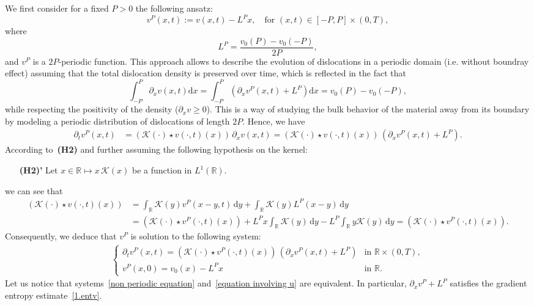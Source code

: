 \documentclass[11pt]{amsart}
\newcommand{\dd}{\mathrm{d}}
\newcommand{\pa}{\partial}
\newcommand{\R}{\mathbb{R}}
\begin{document}
We first consider for a fixed $P>0$ the following ansatz: 
\[
v^P(x, t) := v(x, t) - L^Px, \quad \mbox{for }(x,t) \in [-P,P] \times (0,T),
\]
where 
\begin{equation}\label{def.LP}
L^P=\frac{v_0(P)-v_0(-P)}{2P}, 
\end{equation} 
and $v^P$ is a $2P$-periodic function. This approach allows to describe the evolution of dislocations in a periodic domain (i.e. without boundray effect) assuming that the total dislocation density is preserved over time, which is reflected in the fact that
\begin{equation}\label{densitetotale}
\int_{-P}^P  \partial_x v(x,t) \dd x= \int_{-P}^P  (\partial_x v^P(x,t) +L^P) \dd x= 
 v_0(P)-v_0(-P),
\end{equation}
while respecting the positivity of the density ($\partial_x v \ge 0$). 
This is a way of studying the bulk behavior of the material away from its boundary  by modeling a periodic distribution of dislocations of length $2P$. Hence, we have  
 \begin{align*}
     \partial_t v^P(x,t) &= \left( \mathcal{K}(\cdot) \star v(\cdot,t)(x)\right) \, \partial_x v(x,t)= \left( \mathcal{K}(\cdot) \star v(\cdot,t)(x)\right) \,\left( \partial_x v^P(x, t) + L^P\right).
 \end{align*} 
According to~\textbf{(H2)} and further assuming the following hypothesis on the kernel: 
\begin{itemize}
 \item[\textbf{(H2)'}] Let $x \in \R \mapsto x \, \mathcal{K}(x)$ be a function in $L^1(\R)$.
 \end{itemize}
we  can see that 
 \begin{align*}
     \left( \mathcal{K}(\cdot) \star v(\cdot,t)(x)\right)
     &= \int_{\mathbb{R}}\mathcal{K}(y) v^P(x - y, t)\, \dd y+ \int_{\mathbb{R}}\mathcal{K}(y) L^P(x - y) \, \dd y\\
     &=    \left( \mathcal{K}(\cdot) \star v^P(\cdot,t)(x)\right) + L^Px \int_{\mathbb{R}}\mathcal{K}(y)\, \dd y -  L^P\int_{\mathbb{R}} y\mathcal{K}(y)\, \dd y =   \left(\mathcal{K}(\cdot) \star v^P(\cdot,t)(x)\right).
 \end{align*}
  Consequently, we deduce that  $v^P$ is solution to the following system:
 \begin{align}\label{equation involving u}
 \begin{cases}
        \partial_t v^P(x,t) = \left(\mathcal{K}(\cdot) \star v^P(\cdot,t)(x)\right) \, \left(\partial_x v^P(x, t) + L^P\right) & \mbox{in } \mathbb{R} \times (0, T),\\
        v^P(x,0) = v_0(x) - L^Px & \mbox{in } \mathbb{R}.
 \end{cases}
 \end{align}
Let us notice that systems~\eqref{non periodic equation} and~\eqref{equation involving u} are equivalent. In particular, $\pa_x v^P+L^P$ satisfies the gradient entropy estimate~\eqref{1.entv}.
\end{document}
